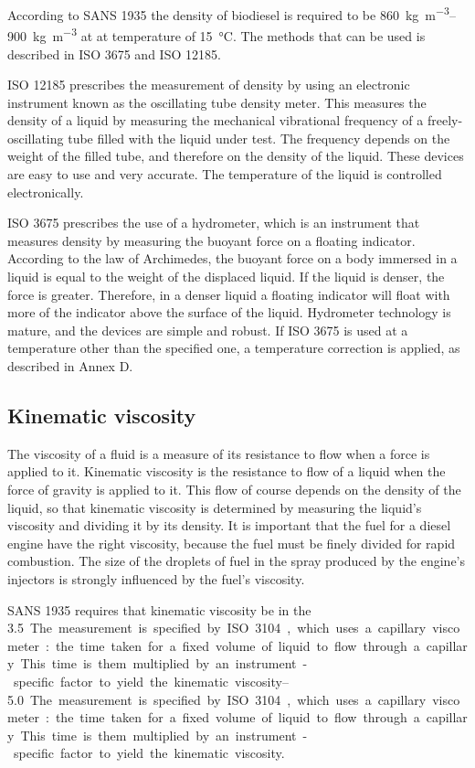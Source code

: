 According to SANS 1935 the density of biodiesel is required to be
\SIrange{860}{900}{\kilogram\per\cubic\metre} at at temperature of
\SI{15}{\celsius}. The methods that can be used is described in ISO 3675 and ISO
12185.

ISO 12185 prescribes the measurement of density by using an electronic
instrument known as the oscillating tube density meter. This measures the
density of a liquid by measuring the mechanical vibrational frequency of a
freely-oscillating tube filled with the liquid under test. The frequency depends
on the weight of the filled tube, and therefore on the density of the liquid.
These devices are easy to use and very accurate. The temperature of the liquid
is controlled electronically.

ISO 3675 prescribes the use of a hydrometer, which is an instrument that
measures density by measuring the buoyant force on a floating indicator.
According to the law of Archimedes, the buoyant force on a body immersed in a
liquid is equal to the weight of the displaced liquid. If the liquid is denser,
the force is greater. Therefore, in a denser liquid a floating indicator will
float with more of the indicator above the surface of the liquid. Hydrometer
technology is mature, and the devices are simple and robust.  If ISO 3675 is
used at a temperature other than the specified one, a temperature correction is
applied, as described in Annex D.

\subsection{Kinematic viscosity}

The viscosity of a fluid is a measure of its resistance to flow when a force is
applied to it. Kinematic viscosity is the resistance to flow of a liquid when
the force of gravity is applied to it. This flow of course depends on the
density of the liquid, so that kinematic viscosity is determined by measuring
the liquid's viscosity and dividing it by its density. It is important that the
fuel for a diesel engine have the right viscosity, because the fuel must be
finely divided for rapid combustion. The size of the droplets of fuel in the
spray produced by the engine's injectors is strongly influenced by the fuel's viscosity. 

SANS 1935 requires that kinematic viscosity be in the \SIrange{3.5}{5.0}. The
measurement is specified by ISO 3104, which uses a capillary viscometer: the
time taken for a fixed volume of liquid to flow through a capillary. This time
is them multiplied by an instrument-specific factor to yield the kinematic
viscosity.

